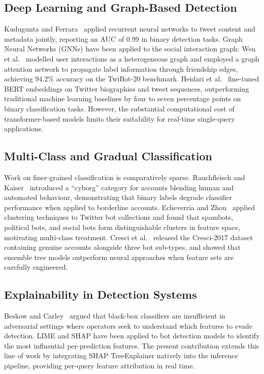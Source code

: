 \documentclass[conference]{IEEEtran}
\begin{document}
\subsection{Deep Learning and Graph-Based Detection}

Kudugunta and Ferrara~\cite{b5} applied recurrent neural networks to
tweet content and metadata jointly, reporting an AUC of 0.99 in binary
detection tasks. Graph Neural Networks (GNNs) have been applied to the
social interaction graph: Wen et al.~\cite{b6} modelled user interactions
as a heterogeneous graph and employed a graph attention network to
propagate label information through friendship edges, achieving 94.2\%
accuracy on the TwiBot-20 benchmark. Heidari et al.~\cite{b7} fine-tuned
BERT embeddings on Twitter biographies and tweet sequences, outperforming
traditional machine learning baselines by four to seven percentage points
on binary classification tasks. However, the substantial computational
cost of transformer-based models limits their suitability for real-time
single-query applications.

\subsection{Multi-Class and Gradual Classification}

Work on finer-grained classification is comparatively sparse.
Rauchfleisch and Kaiser~\cite{b8} introduced a ``cyborg'' category for
accounts blending human and automated behaviour, demonstrating that binary
labels degrade classifier performance when applied to borderline accounts.
Echeverria and Zhou~\cite{b9} applied clustering techniques to Twitter
bot collections and found that spambots, political bots, and social bots
form distinguishable clusters in feature space, motivating multi-class
treatment. Cresci et al.~\cite{b10} released the Cresci-2017 dataset
containing genuine accounts alongside three bot sub-types, and showed
that ensemble tree models outperform neural approaches when feature sets
are carefully engineered.

\subsection{Explainability in Detection Systems}

Beskow and Carley~\cite{b11} argued that black-box classifiers are
insufficient in adversarial settings where operators seek to understand
which features to evade detection. LIME and SHAP have been applied to
bot detection models to identify the most influential per-prediction
features. The present contribution extends this line of work by
integrating SHAP TreeExplainer natively into the inference pipeline,
providing per-query feature attribution in real time.
\end{document}
